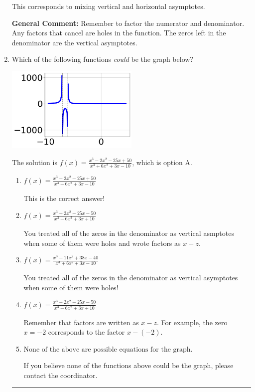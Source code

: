\documentclass{extbook}[14pt]
\newcommand{\litem}[1]{\item #1

\rule{\textwidth}{0.4pt}}
\begin{document}
\begin{enumerate}
{\begin{enumerate}[label=\Alph*.]
This corresponds to mixing vertical and horizontal asymptotes.
\end{enumerate}

\textbf{General Comment:} Remember to factor the numerator and denominator. Any factors that cancel are holes in the function. The zeros left in the denominator are the vertical asymptotes.
}
\litem{
Which of the following functions \textit{could} be the graph below?

\begin{center}
    \includegraphics[width=0.5\textwidth]{../Figures/identifyGraphOfRationalFunctionCopyA.png}
\end{center}


The solution is \( f(x)=\frac{x^{3} -2 x^{2} -25 x + 50}{x^{3} +6 x^{2} +3 x -10} \), which is option A.\begin{enumerate}[label=\Alph*.]
\item \( f(x)=\frac{x^{3} -2 x^{2} -25 x + 50}{x^{3} +6 x^{2} +3 x -10} \)

This is the correct answer!
\item \( f(x)=\frac{x^{3} +2 x^{2} -25 x -50}{x^{3} -6 x^{2} +3 x + 10} \)

You treated all of the zeros in the denominator as vertical asmptotes when some of them were holes and wrote factors as $x+z$.
\item \( f(x)=\frac{x^{3} -11 x^{2} +38 x -40}{x^{3} +6 x^{2} +3 x -10} \)

You treated all of the zeros in the denominator as vertical asymptotes when some of them were holes!
\item \( f(x)=\frac{x^{3} +2 x^{2} -25 x -50}{x^{3} -6 x^{2} +3 x + 10} \)

Remember that factors are written as $x-z$. For example, the zero $x=-2$ corresponds to the factor $x-(-2)$.
\item \( \text{None of the above are possible equations for the graph.} \)

If you believe none of the functions above could be the graph, please contact the coordinator.
\end{enumerate}

}
\end{enumerate}
\end{document}
